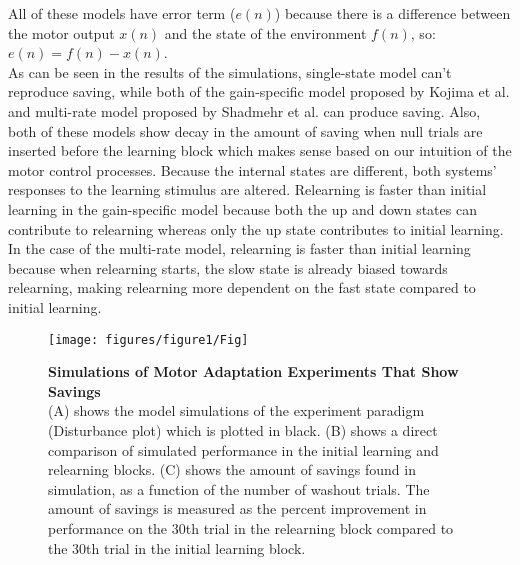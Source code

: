 \documentclass[9pt,twocolumn]{paper-template}
\begin{document}
All of these models have error term ($e(n)$) because there is a difference between the motor output $x(n)$ and the state of the environment $f(n)$, so: $e(n) = f (n) - x(n)$.\\
As can be seen in the results of the simulations, single-state model can't reproduce saving, while both of the gain-specific model proposed by Kojima et al. and multi-rate model proposed by Shadmehr et al. can produce saving. Also, both of these models show decay in the amount of saving when null trials are inserted before the learning block which makes sense based on our intuition of the motor control processes. Because the internal states are different, both systems’ responses to the learning stimulus are altered. Relearning is faster than initial learning in the gain-specific model because both the up and down states can contribute to relearning whereas only the up state contributes to initial learning. In the case of the multi-rate model, relearning is faster than initial learning because when relearning starts, the
slow state is already biased towards relearning, making relearning more dependent on the fast state compared to initial learning.\\



\begin{figure*}[h!]
  \centering
    \texttt{[image: figures/figure1/Fig]}
  \caption{\textbf{Simulations of Motor Adaptation Experiments That Show Savings}\\
  (A) shows the model simulations of the experiment paradigm (Disturbance plot) which is plotted in black. (B) shows a direct comparison of simulated performance in the initial learning and relearning blocks.  (C) shows the amount of savings found in simulation, as a function of the number of washout trials. The amount of savings is measured as the percent improvement in performance on the 30th trial in the relearning block compared to the 30th trial in the initial learning block. 
}
  \label{fig:saving}
\end{figure*}
\end{document}
